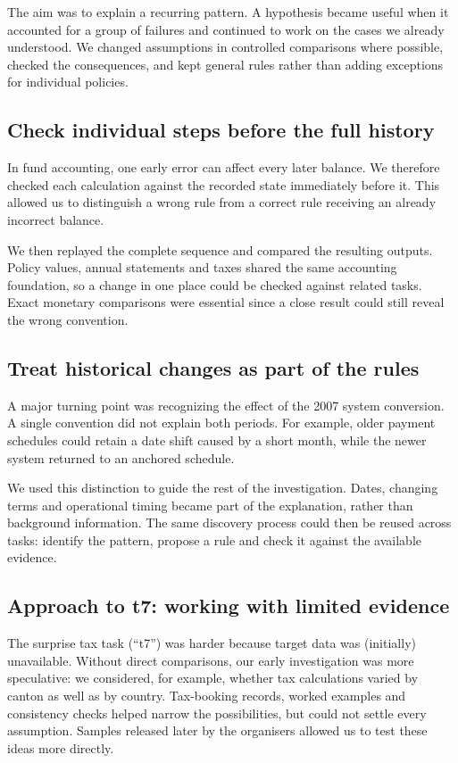 \documentclass[10pt,a4paper]{article}
\begin{document}
The aim was to explain a recurring pattern. A hypothesis became useful when it accounted for a group of failures and continued to work on the cases we already understood. We changed assumptions in controlled comparisons where possible, checked the consequences, and kept general rules rather than adding exceptions for individual policies.

\subsection{Check individual steps before the full history}
In fund accounting, one early error can affect every later balance. We therefore checked each calculation against the recorded state immediately before it. This allowed us to distinguish a wrong rule from a correct rule receiving an already incorrect balance.

We then replayed the complete sequence and compared the resulting outputs. Policy values, annual statements and taxes shared the same accounting foundation, so a change in one place could be checked against related tasks. Exact monetary comparisons were essential since a close result could still reveal the wrong convention.

\subsection{Treat historical changes as part of the rules}
A major turning point was recognizing the effect of the 2007 system conversion. A single convention did not explain both periods. For example, older payment schedules could retain a date shift caused by a short month, while the newer system returned to an anchored schedule.

We used this distinction to guide the rest of the investigation. Dates, changing terms and operational timing became part of the explanation, rather than background information. The same discovery process could then be reused across tasks: identify the pattern, propose a rule and check it against the available evidence.

\subsection{Approach to t7: working with limited evidence}
The surprise tax task (``t7'') was harder because target data was (initially) unavailable. Without direct comparisons, our early investigation was more speculative: we considered, for example, whether tax calculations varied by canton as well as by country. Tax-booking records, worked examples and consistency checks helped narrow the possibilities, but could not settle every assumption. Samples released later by the organisers allowed us to test these ideas more directly.
\end{document}
